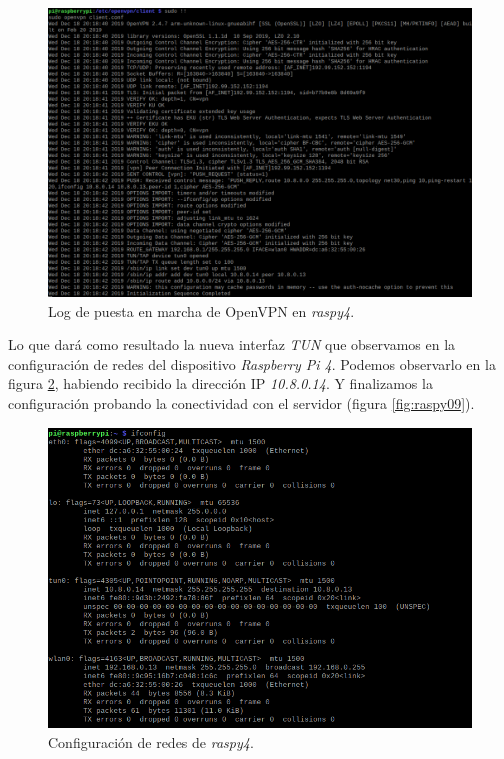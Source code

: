 \documentclass[a4paper, 11pt, titlepage]{article}
\begin{document}
        \begin{figure}[htp]
        \centering
        \includegraphics[width=1\textwidth]{resources/raspy07.png}
        \caption{Log de puesta en marcha de OpenVPN en \textit{raspy4}.}
        \label{fig:raspy07}
        \end{figure}  

        Lo que dará como resultado la nueva interfaz \textit{TUN} que observamos en la configuración
        de redes del dispositivo \textit{Raspberry Pi 4}. Podemos observarlo en la figura \ref{fig:raspy08},
        habiendo recibido la dirección IP \textit{10.8.0.14}. Y finalizamos la configuración probando la 
        conectividad con el servidor (figura \ref{fig:raspy09}).

        \begin{figure}[htp]
            \centering
            \includegraphics[width=1\textwidth]{resources/raspy08.png}
            \caption{Configuración de redes de \textit{raspy4}.}
            \label{fig:raspy08}
        \end{figure}  
\end{document}
